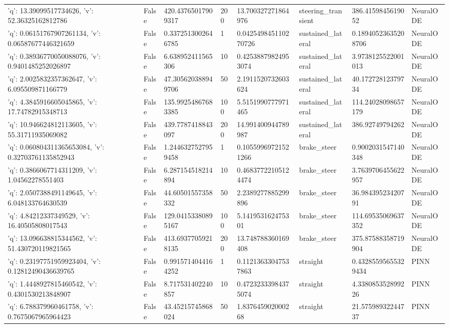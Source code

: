 \begin{tabular}{llllllll}
{'q': 13.39099517734626, 'v': 52.36325162812786} & False & 420.43765017909317 & 200 & 13.700327271864976 & steering\_transient & 386.4159845619052 & NeuralODE \\
{'q': 0.06151767907261134, 'v': 0.06587677446321659} & False & 0.3372513002646785 & 1 & 0.042549845110270726 & sustained\_lateral & 0.18940523635208706 & NeuralODE \\
{'q': 0.38936770050088076, 'v': 0.9401485252026897} & False & 6.638952411565306 & 10 & 0.42538879824953074 & sustained\_lateral & 3.9738125522001013 & NeuralODE \\
{'q': 2.0025832357362647, 'v': 6.095509871166779} & False & 47.305620388949706 & 50 & 2.1911520732603624 & sustained\_lateral & 40.17272812379734 & NeuralODE \\
{'q': 4.3845916605045865, 'v': 17.74782915348713} & False & 135.99254867683385 & 100 & 5.5151990777971465 & sustained\_lateral & 114.24028098657179 & NeuralODE \\
{'q': 10.946624812113605, 'v': 55.31711935069082} & False & 439.7787418843097 & 200 & 14.991400944789987 & sustained\_lateral & 386.92749794262 & NeuralODE \\
{'q': 0.060804311365653084, 'v': 0.32703761135852943} & False & 1.2446327527959458 & 1 & 0.10559969721521266 & brake\_steer & 0.9002031547140348 & NeuralODE \\
{'q': 0.3866067714311209, 'v': 1.04562278551403} & False & 6.287154518214894 & 10 & 0.46837722105124474 & brake\_steer & 3.7639706455622957 & NeuralODE \\
{'q': 2.0507388491149645, 'v': 6.048133764630539} & False & 44.60501557358332 & 50 & 2.2389277885299896 & brake\_steer & 36.98439523420791 & NeuralODE \\
{'q': 4.84212337349529, 'v': 16.40505808017543} & False & 129.04153380895167 & 100 & 5.141953162475301 & brake\_steer & 114.69535069637352 & NeuralODE \\
{'q': 13.096638815344562, 'v': 51.430720119821565} & False & 413.69377059218135 & 200 & 13.748788360169408 & brake\_steer & 375.87588358719904 & NeuralODE \\
{'q': 0.23197751959923404, 'v': 0.12812490436639765} & False & 0.9915714044164252 & 1 & 0.11213633047537863 & straight & 0.43285595655329434 & PINN \\
{'q': 1.4448927815460542, 'v': 0.4301530213848907} & False & 8.717531402240857 & 10 & 0.47232333984375074 & straight & 4.338085352899226 & PINN \\
{'q': 6.788379960461758, 'v': 0.7675067965964423} & False & 43.45215745868024 & 50 & 1.837645902000268 & straight & 21.57598932244737 & PINN \\

\end{tabular}
